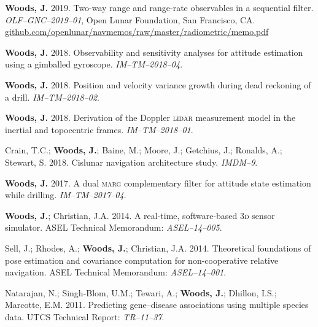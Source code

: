 \documentclass[12pt,letterpaper]{article}
\begin{document}
\medskip
\par\textbf{Woods, J.} 2019. Two-way range and range-rate observables in a sequential filter. \textit{OLF--GNC--2019--01}, Open Lunar Foundation, San Francisco, CA. \href{https://github.com/openlunar/navmemos/raw/master/radiometric/memo.pdf}{github.com/openlunar/navmemos/raw/master/radiometric/memo.pdf}

\medskip
\par\textbf{Woods, J.} 2018. Observability and sensitivity analyses for attitude estimation using a gimballed gyroscope. \textit{IM--TM--2018--04}.

\medskip
\par \textbf{Woods, J.} 2018. Position and velocity variance growth during dead reckoning of a drill. \textit{IM--TM--2018--02}.

\medskip
\par \textbf{Woods, J.} 2018. Derivation of the Doppler \textsc{lidar} measurement model in the inertial and topocentric frames. \textit{IM--TM--2018--01}.

\medskip
\par Crain, T.C.; \textbf{Woods, J.}; Baine, M.; Moore, J.; Getchius, J.; Ronalds, A.; Stewart, S. 2018. Cislunar navigation architecture study. \textit{IMDM--9}.

\medskip
\par \textbf{Woods, J.} 2017. A dual \textsc{marg} complementary filter for attitude state estimation while drilling. \textit{IM--TM--2017--04}.

\medskip
\par \textbf{Woods, J.}; Christian, J.A. 2014. A real-time, software-based \textsc{3d} sensor simulator. ASEL Technical Memorandum: \textit{ASEL--14--005}.

\medskip
\par Sell, J.; Rhodes, A.; \textbf{Woods, J.}; Christian, J.A. 2014. Theoretical foundations of pose estimation and covariance computation for non-cooperative relative navigation. ASEL Technical Memorandum: \textit{ASEL--14--001}.

\medskip
\par Natarajan, N.; Singh-Blom, U.M.; Tewari, A.; \textbf{Woods, J.}; Dhillon, I.S.; Marcotte, E.M. 2011. Predicting gene--disease associations using multiple species data. UTCS Technical Report: \textit{TR--11--37}.
\end{document}
